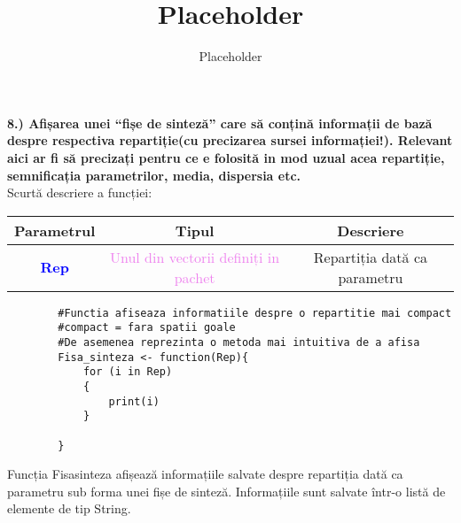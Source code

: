 \documentclass[12pt]{article}
\title{Placeholder}
\author{Placeholder}
\begin{document}
	
	\textbf{8.) Afișarea unei “fișe de sinteză” care să conțină informații de bază despre respectiva
		repartiție(cu precizarea sursei informației!). Relevant aici ar fi să precizați pentru ce e
		folosită in mod uzual acea repartiție, semnificația parametrilor, media, dispersia etc.}\vspace{5mm}\\
\indent Scurtă descriere a funcției: \\
\begin{center}
	\begin{tabular}{|| c | c | c ||}
		\hline
		Parametrul & Tipul & Descriere \\
		\hline
		\textbf{\textcolor{blue}{Rep}} & \textcolor{violet}{Unul din vectorii definiți in pachet} & Repartiția dată ca parametru \\
		\hline
	\end{tabular}
\end{center}	
	\begin{lstlisting}
		#Functia afiseaza informatiile despre o repartitie mai compact
		#compact = fara spatii goale
		#De asemenea reprezinta o metoda mai intuitiva de a afisa
		Fisa_sinteza <- function(Rep){
			for (i in Rep)
			{
				print(i)
			}
			
		}
	\end{lstlisting}
	
	
	Funcția Fisa\underline{\hspace{.08in}}sinteza afișează informațiile salvate despre repartiția dată ca parametru sub forma unei fișe de sinteză.\hfill \break
	\indent Informațiile sunt salvate într-o listă de elemente de tip String.
	
	
\end{document}

